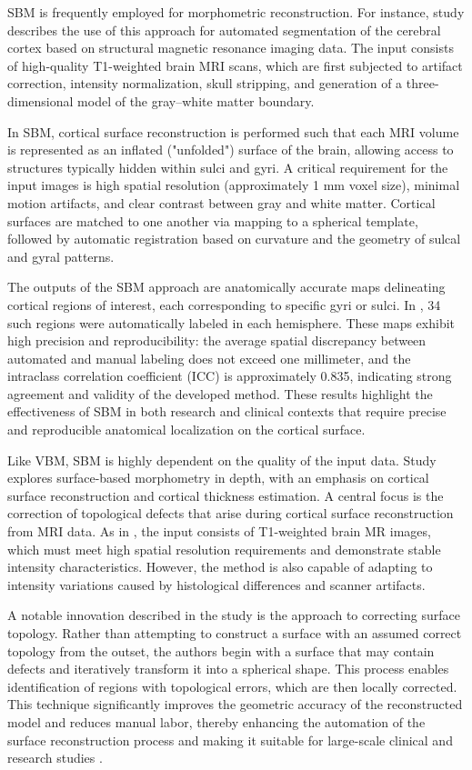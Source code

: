 \documentclass[default]{subfiles}
\begin{document}
SBM is frequently employed for morphometric reconstruction. For instance, study \cite{desikan_2006} describes the use
of this approach for automated segmentation of the cerebral cortex based on structural magnetic resonance imaging data.
The input consists of high-quality T1-weighted brain MRI scans, which are first subjected to artifact correction,
intensity normalization, skull stripping, and generation of a three-dimensional model of the gray–white matter
boundary.

In SBM, cortical surface reconstruction is performed such that each MRI volume is represented as an inflated
("unfolded") surface of the brain, allowing access to structures typically hidden within sulci and gyri. A critical
requirement for the input images is high spatial resolution (approximately 1 mm voxel size), minimal motion artifacts,
and clear contrast between gray and white matter. Cortical surfaces are matched to one another via mapping to a
spherical template, followed by automatic registration based on curvature and the geometry of sulcal and gyral
patterns.

The outputs of the SBM approach are anatomically accurate maps delineating cortical regions of interest, each
corresponding to specific gyri or sulci. In \cite{desikan_2006}, 34 such regions were automatically labeled in each
hemisphere. These maps exhibit high precision and reproducibility: the average spatial discrepancy between automated
and manual labeling does not exceed one millimeter, and the intraclass correlation coefficient (ICC) is approximately
0.835, indicating strong agreement and validity of the developed method. These results highlight the effectiveness of
SBM in both research and clinical contexts that require precise and reproducible anatomical localization on the
cortical surface.

Like VBM, SBM is highly dependent on the quality of the input data. Study \cite{fischl_2012} explores surface-based
morphometry in depth, with an emphasis on cortical surface reconstruction and cortical thickness estimation. A central
focus is the correction of topological defects that arise during cortical surface reconstruction from MRI data. As in
\cite{desikan_2006}, the input consists of T1-weighted brain MR images, which must meet high spatial resolution
requirements and demonstrate stable intensity characteristics. However, the method is also capable of adapting to
intensity variations caused by histological differences and scanner artifacts.

A notable innovation described in the study is the approach to correcting surface topology. Rather than attempting to
construct a surface with an assumed correct topology from the outset, the authors begin with a surface that may contain
defects and iteratively transform it into a spherical shape. This process enables identification of regions with
topological errors, which are then locally corrected. This technique significantly improves the geometric accuracy of
the reconstructed model and reduces manual labor, thereby enhancing the automation of the surface reconstruction
process and making it suitable for large-scale clinical and research studies \cite{yotter_2011}.
\end{document}
